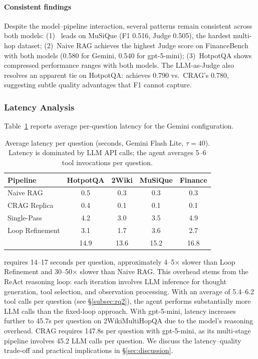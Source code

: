 \paragraph{Consistent findings}
Despite the model--pipeline interaction, several patterns remain consistent across both models:
(1)~\ours{} leads on MuSiQue (F1 0.516, Judge 0.505), the hardest multi-hop dataset;
(2)~Naive RAG achieves the highest Judge score on FinanceBench with both models (0.580 for Gemini, 0.540 for gpt-5-mini);
(3)~HotpotQA shows compressed performance ranges with both models.
The LLM-as-Judge also resolves an apparent tie on HotpotQA: \ours{} achieves 0.790 vs.\ CRAG's 0.780, suggesting subtle quality advantages that F1 cannot capture.

\subsubsection{Latency Analysis}
\label{subsubsec:latency}

Table~\ref{tab:latency} reports average per-question latency for the Gemini configuration.

\begin{table}[t]
\centering
\caption{Average latency per question (seconds, Gemini Flash Lite, $\tau = 40$). Latency is dominated by LLM API calls; the agent averages 5--6 tool invocations per question.}
\label{tab:latency}
\begin{tabular}{lcccc}
\toprule
\textbf{Pipeline} & \textbf{HotpotQA} & \textbf{2Wiki} & \textbf{MuSiQue} & \textbf{Finance} \\
\midrule
Naive RAG       & 0.5 & 0.3 & 0.3 & 0.3 \\
CRAG Replica    & 0.4 & 0.1 & 0.1 & 0.1 \\
Single-Pass     & 4.2 & 3.0 & 3.5 & 4.9 \\
Loop Refinement & 3.1 & 1.7 & 3.6 & 2.7 \\
\textbf{\ours{}} & 14.9 & 13.6 & 15.2 & 16.8 \\
\bottomrule
\end{tabular}
\end{table}

\ours{} requires 14--17 seconds per question, approximately 4--5$\times$ slower than Loop Refinement and 30--50$\times$ slower than Naive RAG.
This overhead stems from the ReAct reasoning loop: each iteration involves LLM inference for thought generation, tool selection, and observation processing.
With an average of 5.4--6.2 tool calls per question (see \S\ref{subsec:rq2}), the agent performs substantially more LLM calls than the fixed-loop approach.
With gpt-5-mini, latency increases further to 45.7s per question on 2WikiMultiHopQA due to the model's reasoning overhead. CRAG requires 147.8s per question with gpt-5-mini, as its multi-stage pipeline involves 45.2 LLM calls per question.
We discuss the latency--quality trade-off and practical implications in \S\ref{sec:discussion}.

